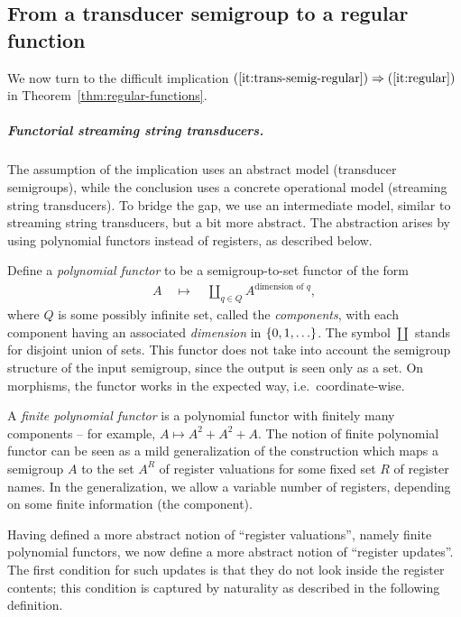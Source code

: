\subsection{From a transducer semigroup to a regular function}
\label{sec:hard}
We now turn to the difficult implication $(\ref{it:trans-semig-regular}) \Rightarrow (\ref{it:regular})$ in Theorem~\ref{thm:regular-functions}. 

\subparagraph*{Functorial streaming string transducers.}
\label{sec:abstract-sst} 
The assumption of the implication uses an abstract model (transducer semigroups), while the conclusion uses a concrete operational model (streaming string transducers). To bridge the gap, we use an intermediate model, similar to streaming string transducers, but a bit more abstract. The abstraction arises by using polynomial functors instead of registers, as described below. 

Define a \emph{polynomial functor} to be a semigroup-to-set functor of the form
\begin{align*}
A \quad \mapsto \quad \coprod_{q \in Q} A^{\text{dimension of } q},
\end{align*}
where $Q$ is some possibly infinite set, called the \emph{components}, with each  component having an associated \emph{dimension} in $\{0,1,\ldots\}$. The symbol $\coprod$ stands for disjoint union of sets. This functor does not take into account the semigroup structure of the input semigroup, since the output is seen only as a set.
On morphisms, the functor works in the expected way, i.e.~coordinate-wise.  

A \emph{finite polynomial functor} is a polynomial functor with finitely many components -- for example, $A \mapsto A^2 + A^2 + A$. 
The notion of finite polynomial functor can be seen as a mild generalization of the construction which maps a semigroup $A$ to the set $A^R$ of register valuations for some fixed set $R$ of register names.  In the generalization, we allow a variable number of registers, depending on some finite information (the component). 

Having defined a more abstract notion of ``register valuations'', namely finite polynomial functors, we now define a more abstract notion of ``register updates''.  The first condition for such updates is that they do not look inside the register contents; this condition is captured by naturality as described in the following definition. 



